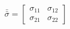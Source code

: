 $$\bar{\bar{\sigma}}=\begin{bmatrix}
  \sigma_{11} & \sigma_{12} \\
  \sigma_{21} & \sigma_{22} 
\end{bmatrix}$$

